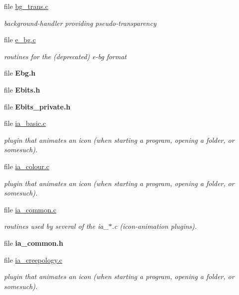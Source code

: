 \begin{CompactItemize}
\item 
file \hyperlink{bg__trans_8c}{bg\_\-trans.c}
\begin{CompactList}\small\item\em background-handler providing pseudo-transparency \item\end{CompactList}

\item 
file \hyperlink{e__bg_8c}{e\_\-bg.c}
\begin{CompactList}\small\item\em routines for the (deprecated) e-bg format \item\end{CompactList}

\item 
file {\bf Ebg.h}
\item 
file {\bf Ebits.h}
\item 
file {\bf Ebits\_\-private.h}
\item 
file \hyperlink{ia__basic_8c}{ia\_\-basic.c}
\begin{CompactList}\small\item\em plugin that animates an icon (when starting a program, opening a folder, or somesuch). \item\end{CompactList}

\item 
file \hyperlink{ia__colour_8c}{ia\_\-colour.c}
\begin{CompactList}\small\item\em plugin that animates an icon (when starting a program, opening a folder, or somesuch). \item\end{CompactList}

\item 
file \hyperlink{ia__common_8c}{ia\_\-common.c}
\begin{CompactList}\small\item\em routines used by several of the ia\_\-$\ast$.c (icon-animation plugins). \item\end{CompactList}

\item 
file {\bf ia\_\-common.h}
\item 
file \hyperlink{ia__creepology_8c}{ia\_\-creepology.c}
\begin{CompactList}\small\item\em plugin that animates an icon (when starting a program, opening a folder, or somesuch). \item\end{CompactList}


\end{CompactItemize}
